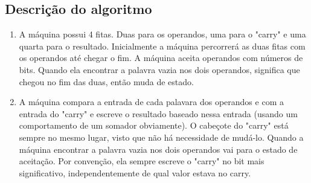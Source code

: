 \documentclass{article}
\begin{document}
    \subsection{Descrição do algoritmo}
    \begin{enumerate}        
        \item A máquina possui 4 fitas. Duas para os operandos, uma para 
        o "carry" e uma quarta para o resultado. Inicialmente a máquina 
        percorrerá as duas fitas com os operandos até chegar o fim. A
        máquina aceita operandos com números de bits. Quando ela encontrar
        a palavra vazia nos dois operandos, significa que chegou no fim das
        duas, então muda de estado.        
        \item A máquina compara a entrada de cada palavara dos operandos
        e com a entrada do "carry" e escreve o resultado baseado nessa
        entrada (usando um comportamento de um somador obviamente). O
        cabeçote do "carry" está sempre no mesmo lugar, visto que não há
        necessidade de mudá-lo. Quando a máquina encontrar a palavra vazia
        nos dois operandos vai para o estado de aceitação. Por convenção,
        ela sempre escreve o "carry" no bit mais significativo,
        independentemente de qual valor estava no carry.
    \end{enumerate}
\end{document}
